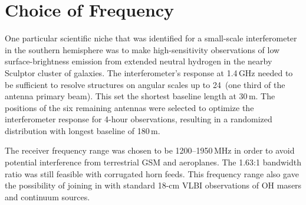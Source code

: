 \section{Choice of Frequency}
\label{sec:freq}

\noindent
One particular scientific niche that was identified for a small-scale
interferometer in the southern hemisphere was to make high-sensitivity
observations of low surface-brightness emission from extended neutral
hydrogen in the nearby Sculptor cluster of galaxies. The
interferometer's response at 1.4\,GHz needed to be sufficient to
resolve structures on angular scales up to 24\arcmin\ (one third of
the antenna primary beam). This set the shortest baseline length at
30\,m. The positions of the six remaining antennas were selected to
optimize the interferometer response for 4-hour observations,
resulting in a randomized distribution with longest baseline of
180\,m.

The receiver frequency range was chosen to be 1200--1950\,MHz in order
to avoid potential interference from terrestrial GSM and
aeroplanes. The 1.63:1 bandwidth ratio was still feasible with
corrugated horn feeds. This frequency range also gave the possibility
of joining in with standard 18-cm VLBI observations of OH masers and
continuum sources.
